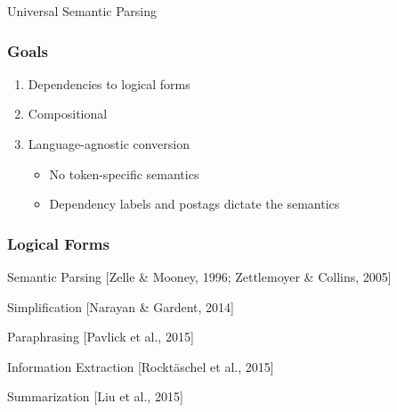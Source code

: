 \documentclass[mathserif,12pt]{beamer}
\begin{document}
\begin{frame}
\Large
\centering
\vspace{1.5em}
Universal Semantic Parsing
\end{frame}

\begin{frame}
\frametitle{Goals}
\Large
\begin{enumerate}
\item Dependencies to logical forms
\vspace{1em}
\item Compositional
\vspace{1em}
\item Language-agnostic conversion
\begin{itemize}
  \large
  \vspace{1em}
  \item No token-specific semantics
  \vspace{1em}
  \item Dependency labels and postags dictate the semantics
\end{itemize}
\end{enumerate}

\end{frame}

\begin{frame}
 \frametitle{Logical Forms}
\large
Semantic Parsing {\scriptsize [Zelle \& Mooney, 1996; Zettlemoyer \& Collins, 2005]}
 
 \vspace{1em}
Simplification {\scriptsize [Narayan \& Gardent, 2014]}
 
 \vspace{1em}
Paraphrasing {\scriptsize [Pavlick et al., 2015]}
 
 \vspace{1em}
Information Extraction {\scriptsize [Rockt\"aschel et al., 2015]}
 
 \vspace{1em}
Summarization {\scriptsize [Liu et al., 2015]}
\end{frame}
\end{document}
